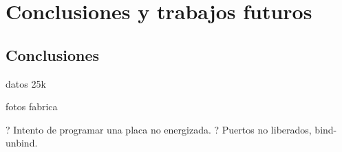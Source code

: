 
\chapter{Conclusiones y trabajos futuros} %

\label{Chapter4} %


\section{Conclusiones}

datos 25k

fotos fabrica

? Intento de programar una placa no energizada.
? Puertos no liberados, bind-unbind.
